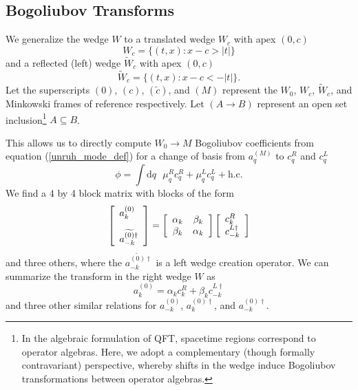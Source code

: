 \documentclass[12pt,a4paper]{article}
\newcommand{\dv}[1]{\mathrm{d} #1 \text{ }}
\begin{document}
\subsection{Bogoliubov Transforms}
We generalize the wedge $W$ to a translated wedge $W_c$ with apex $(0,c)$
\begin{equation}
 W_c = \{(t,x) : x - c > |t|\} 
\end{equation}
and a reflected (left) wedge $\widetilde{W}_c$ with apex $(0,c)$
\begin{equation}
 \widetilde{W}_c = \{(t,x) : x - c < -|t|\}.
\end{equation}
Let the superscripts $(0)$, $(c)$, $(\widetilde{c})$, and $(M)$ represent the $W_0$, $W_c$, $\widetilde{W}_c$, and Minkowski frames of reference respectively.  Let $(A \rightarrow B)$ represent an open set inclusion\footnote{In the algebraic formulation of QFT, spacetime regions correspond to operator algebras. Here, we adopt a complementary (though formally contravariant) perspective, whereby shifts in the wedge induce Bogoliubov transformations between operator algebras.} $A \subseteq B$.

This allows us to directly compute $W_0 \rightarrow M$ Bogoliubov coefficients from equation (\ref{unruh_mode_def}) for a change of basis from $a^{(M)}_q$ to $c^R_q$ and $c^L_q$
\begin{equation}
  \phi = \int \dv{q} \mu_q^R c_q^R + \mu_q^L c_q^L + \text{h.c.}
  \label{c_ladder}
\end{equation}
We find a 4 by 4 block matrix with blocks of the form
\begin{equation}
  \left[ \begin{array}{l}
      a^{(0)}_k \vspace{10 pt}\\
    a^{\widetilde{(0)}\dagger}_{-k} \\
 \end{array} \right] = 
  \left[
\begin{array}{cc}
    \alpha_k &      \beta_k \\
    \beta_k        & \alpha_k \\
\end{array} \right]
\left[ \begin{array}{l}
    c^R_k \\
    c^{L\dagger}_{-k} \\
  \end{array} \right]
\label{diag}
\end{equation}
and three others, where the $a^{\widetilde{(0)}\dagger}_{-k}$ is a left wedge creation operator. We can summarize the transform in the right wedge $W$ as
\begin{equation}
  a_k^{(0)} = \alpha_k c_k^R + \beta_k c_{-k}^{L\dagger}
\label{a_in_c}
\end{equation}
and three other similar relations for $a_{-k}^{(0)}$, $a_{k}^{(0)\dagger}$, and $a_{-k}^{(0)\dagger}$.
\end{document}
